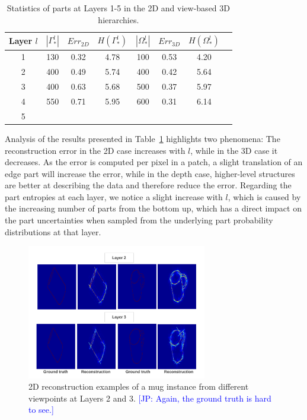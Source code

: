 \documentclass[runningheads]{llncs}
\newcommand{\commentJP}[1]{\textcolor{blue}{[JP: #1]}}
\begin{document}
 \begin{table}
 \begin{center}
  \begin{tabular}{ | c | c | c | c | c | c | c |r |}
      \hline
      Layer $l$  & $|\Gamma_*^l|$ & $Err_{2D}$ & $H(\Gamma_*^l)$ &  $|\Omega_*^l|$ & $Err_{3D}$ & $H(\Omega_*^l)$  \\ \hline
    1 &  130 & 0.32 & 4.78 & 100 & 0.53 & 4.20 \\ \hline
    2 &  400 & 0.49 & 5.74 & 400 & 0.42 & 5.64 \\ \hline
    3 &  400 & 0.63 & 5.68 & 500 & 0.37 & 5.97 \\ \hline 
    4 &  550 & 0.71 & 5.95 & 600 & 0.31 & 6.14 \\ \hline
    5 &   &  &  &  &  &  \\ 
    \hline
  \end{tabular}
\end{center}
 \caption{Statistics of parts at Layers 1-5 in the 2D and view-based 3D hierarchies.}
 \label{tab:stats}
\end{table}

Analysis of the results presented in Table~\ref{tab:stats} highlights two phenomena: The reconstruction error in the 2D case increases with $l$, while in the 3D case it decreases. As the error is computed per pixel in a patch, a slight translation of an edge part will increase the error, while in the depth case, higher-level structures are better at describing the data and therefore reduce the error. Regarding the part entropies at each layer, we notice a slight increase with $l$, which is caused by the increasing number of parts from the bottom up, which has a direct impact on the part uncertainties when sampled from the underlying part probability distributions at that layer.

\begin{figure}
\begin{center}
\includegraphics[width=0.7\textwidth]{reconstruction_edge}
\end{center}
\caption{2D reconstruction examples of a mug instance from different viewpoints at Layers 2 and 3.  \commentJP{Again, the ground truth is hard to see.}}
\label{reconstructionEdge}
\end{figure}
\end{document}
